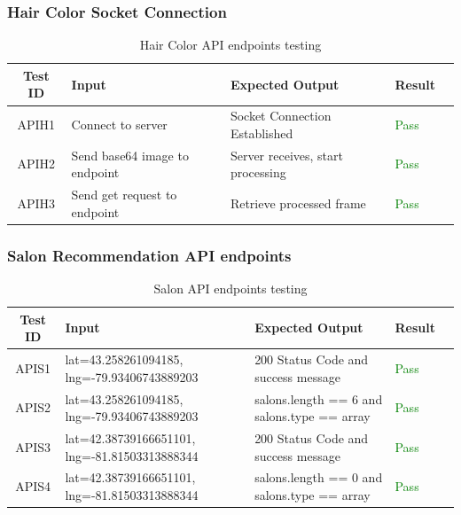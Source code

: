 \documentclass[12pt, titlepage]{article}
\begin{document}
\subsubsection{Hair Color Socket Connection}
\begin{table}[ht!]
\noindent
    \centering
    \begin{tabular}{|c|p{}|p{}|p{}|c|}
    \hline
        \textbf{Test ID} & \textbf{Input} & \textbf{Expected Output} & \textbf{Result} \\ \hline
        APIH1 & Connect to server & Socket Connection Established & \textcolor{green}{Pass} \\ \hline
        APIH2 & Send base64 image to endpoint & Server receives, start processing & \textcolor{green}{Pass} \\ \hline
        APIH3 & Send get request to endpoint & Retrieve processed frame & \textcolor{green}{Pass} \\ \hline
    \end{tabular}
    \caption{Hair Color API endpoints testing}
\end{table}
\subsubsection{Salon Recommendation API endpoints}
\begin{table}[ht!]
\noindent
    \centering
    \begin{tabular}{|c|p{}|p{}|p{}|c|}
    \hline
        \textbf{Test ID} & \textbf{Input} & \textbf{Expected Output} & \textbf{Result} \\ \hline
        APIS1 & lat=43.258261094185, lng=-79.93406743889203 & 200 Status Code and success message & \textcolor{green}{Pass} \\ \hline
        APIS2 & lat=43.258261094185, lng=-79.93406743889203 & salons.length == 6 and salons.type == array & \textcolor{green}{Pass} \\ \hline
        APIS3 & lat=42.38739166651101, lng=-81.81503313888344 & 200 Status Code and success message & \textcolor{green}{Pass} \\ \hline
        APIS4 & lat=42.38739166651101, lng=-81.81503313888344 & salons.length == 0 and salons.type == array & \textcolor{green}{Pass} \\ \hline
    \end{tabular}
    \caption{Salon API endpoints testing}
\end{table}
\newpage
\end{document}
